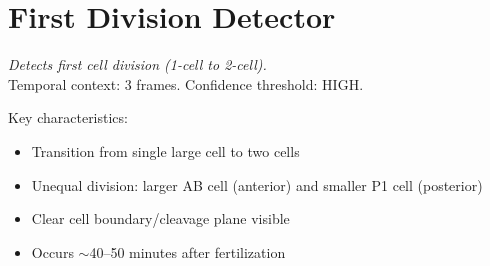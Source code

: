 \documentclass[11pt,letterpaper]{article}
\begin{document}
\section{First Division Detector}

\textit{Detects first cell division (1-cell to 2-cell).}\\
Temporal context: 3 frames. Confidence threshold: HIGH.

Key characteristics:
\begin{itemize}
    \item Transition from single large cell to two cells
    \item Unequal division: larger AB cell (anterior) and smaller P1 cell (posterior)
    \item Clear cell boundary/cleavage plane visible
    \item Occurs $\sim$40--50 minutes after fertilization
\end{itemize}
\end{document}
